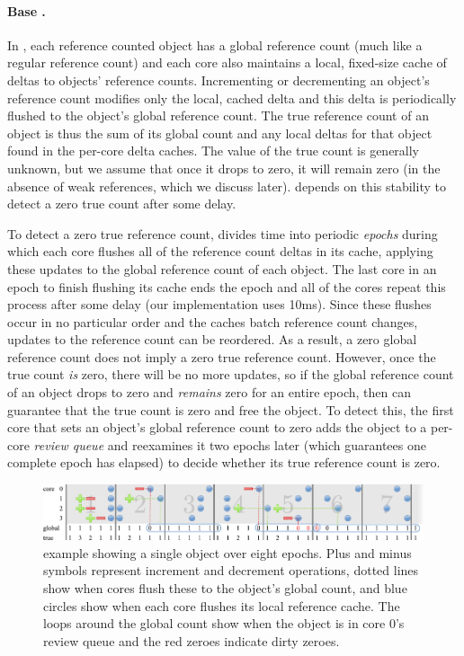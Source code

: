 \paragraph{Base .}
In , each reference counted object has a global reference
count (much like a regular reference count) and each core also
maintains a local, fixed-size cache of deltas to objects' reference
counts.  Incrementing or decrementing an object's reference count
modifies only the local, cached delta and this delta is periodically
flushed to the object's global reference count.  The true reference
count of an object is thus the sum of its global count and any local
deltas for that object found in the per-core delta caches.  The value of the
true count is generally unknown, but we assume that once it drops to
zero, it will remain zero (in the absence of weak references, which
we discuss later).   depends on this stability to detect a
zero true count after some delay.

To detect a zero true reference count,  divides time into
periodic \emph{epochs} during which each core flushes all of the
reference count deltas in its cache, applying these updates to the
global reference count of each object.  The last core in an epoch to
finish flushing its cache ends the epoch and all of the cores repeat
this process after some delay (our implementation uses 10ms).  Since
these flushes occur in no particular order and the caches batch
reference count changes, updates to the reference count can be
reordered.  As a result, a zero global reference count does not imply
a zero true reference count.  However, once the true count \emph{is}
zero, there will be no more updates, so if the global reference count
of an object drops to zero and \emph{remains} zero for an entire
epoch, then  can guarantee that the true count is zero
and free the object.  To detect this, the first core that sets an object's
global reference count to zero adds the object to a per-core
\emph{review queue} and reexamines it two epochs later (which
guarantees one complete epoch has elapsed) to decide whether its true
reference count is zero.

\begin{figure}
  \centering
  \includegraphics[width=\textwidth]{figures/refcache.pdf}
  \caption{ example showing a single object over eight
    epochs.  Plus and minus symbols represent increment and decrement
    operations, dotted lines show when cores flush these to the object's
    global count, and blue circles show when each core flushes its
    local reference cache.  The loops around the global count show
    when the object is in core 0's review queue and
    the red zeroes indicate dirty zeroes.}
  \label{fig:refcache-ex}
\end{figure}

